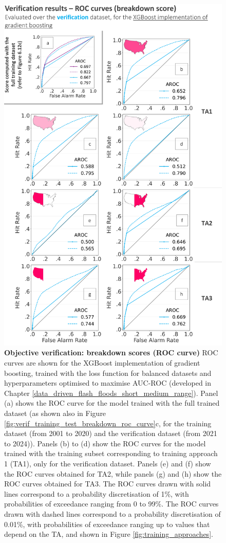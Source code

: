 \begin{figure}[htbp]
\centering
\includegraphics[scale = 0.95]{verif_breakdown_scores_roc_curve.png}
\caption{\textbf{Objective verification: breakdown scores (ROC curve)} ROC curves are shown for the XGBoost implementation of gradient boosting, trained with the loss function for balanced datasets and hyperparameters optimised to maximise AUC-ROC (developed in Chapter \ref{data_driven_flash_floods_short_medium_range}). Panel (a) shows the ROC curve for the model trained with the full trained dataset (as shown also in Figure \ref{fig:verif_training_test_breakdown_roc_curve}c, for the \textcolor{colourTraining}{training} dataset (from 2001 to 2020) and the \textcolor{colourTest}{verification} dataset (from 2021 to 2024)). Panels (b) to (d) show the ROC curves for the model trained with the training subset corresponding to training approach 1 (TA1), only for the \textcolor{colourTest}{verification} dataset. Panels (e) and (f) show the ROC curves obtained for TA2, while panels (g) and (h) show the ROC curves obtained for TA3. The ROC curves drawn with solid lines correspond to a probability discretisation of 1\%, with probabilities of exceedance ranging from 0 to 99\%. The ROC curves drawn with dashed lines correspond to a probability discretisation of 0.01\%, with probabilities of exceedance ranging up to values that depend on the TA, and shown in Figure \ref{fig:training_approaches}.}

\end{figure}
